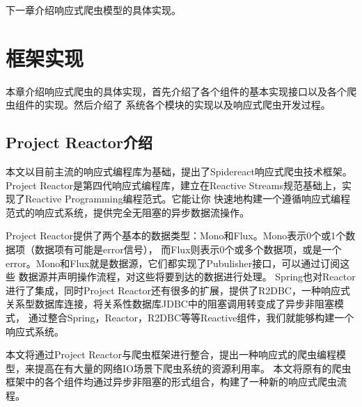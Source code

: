 \documentclass[master]{njuthesis}
\begin{document}
下一章介绍响应式爬虫模型的具体实现。



\chapter{框架实现}\label{Chapter_impletation}
本章介绍响应式爬虫的具体实现，首先介绍了各个组件的基本实现接口以及各个爬虫组件的实现。然后介绍了
系统各个模块的实现以及响应式爬虫开发过程。

\section{Project Reactor介绍}
本文以目前主流的响应式编程库为基础，提出了Spidereact响应式爬虫技术框架。
Project Reactor是第四代响应式编程库\cite{project_reactor}，建立在Reactive Streams规范基础上，实现了Reactive Programming编程范式。它能让你
快速地构建一个遵循响应式编程范式的响应式系统，提供完全无阻塞的异步数据流操作。

Project Reactor提供了两个基本的数据类型：Mono和Flux。Mono表示0个或1个数据项（数据项有可能是error信号），
而Flux则表示0个或多个数据项，或是一个error。Mono和Flux就是数据源，它们都实现了Pubulisher接口，可以通过订阅这些
数据源并声明操作流程，对这些将要到达的数据进行处理\cite{chen2018improving}。
Spring也对Reactor进行了集成，同时Project Reactor还有很多的扩展，提供了R2DBC，一种响应式关系型数据库连接，将关系性数据库JDBC中的阻塞调用转变成了异步非阻塞模式，
通过整合Spring，Reactor，R2DBC等等Reactive组件，我们就能够构建一个响应式系统。

本文将通过Project Reactor与爬虫框架进行整合，提出一种响应式的爬虫编程模型，来提高在有大量的网络IO场景下爬虫系统的资源利用率。
本文将原有的爬虫框架中的各个组件均通过异步非阻塞的形式组合，构建了一种新的响应式爬虫流程。
\end{document}
